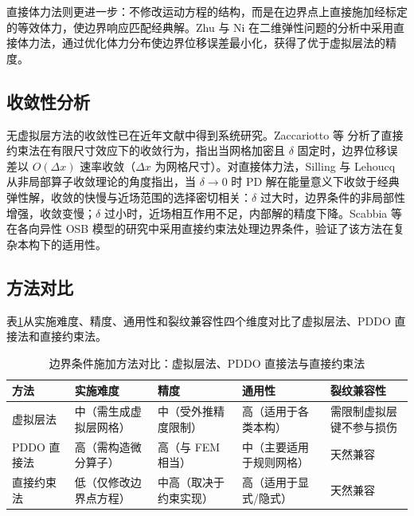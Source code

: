 直接体力法则更进一步：不修改运动方程的结构，而是在边界点上直接施加经标定的等效体力，使边界响应匹配经典解。Zhu 与 Ni \cite{ZhuNi2017} 在二维弹性问题的分析中采用直接体力法，通过优化体力分布使边界位移误差最小化，获得了优于虚拟层法的精度。

\subsection{收敛性分析}

无虚拟层方法的收敛性已在近年文献中得到系统研究。Zaccariotto 等 \cite{Zaccariotto2018} 分析了直接约束法在有限尺寸效应下的收敛行为，指出当网格加密且 $\delta$ 固定时，边界位移误差以 $O(\Delta x)$ 速率收敛（$\Delta x$ 为网格尺寸）。对直接体力法，Silling 与 Lehoucq \cite{SillingLehoucq2008} 从非局部算子收敛理论的角度指出，当 $\delta\to 0$ 时 PD 解在能量意义下收敛于经典弹性解，收敛的快慢与近场范围的选择密切相关：$\delta$ 过大时，边界条件的非局部性增强，收敛变慢；$\delta$ 过小时，近场相互作用不足，内部解的精度下降。Scabbia 等 \cite{Scabbia2024} 在各向异性 OSB 模型的研究中采用直接约束法处理边界条件，验证了该方法在复杂本构下的适用性。

\subsection{方法对比}

表\ref{tab:bc-methods-compare}从实施难度、精度、通用性和裂纹兼容性四个维度对比了虚拟层法、PDDO 直接法和直接约束法。

\begin{table}[htbp]
\centering
\small
\caption{边界条件施加方法对比：虚拟层法、PDDO 直接法与直接约束法}
\label{tab:bc-methods-compare}
\begin{tabular}{>{\raggedright\arraybackslash}p{}>{\raggedright\arraybackslash}p{}>{\raggedright\arraybackslash}p{}>{\raggedright\arraybackslash}p{}>{\raggedright\arraybackslash}p{}}
\toprule
方法 & 实施难度 & 精度 & 通用性 & 裂纹兼容性 \\
\midrule
虚拟层法 & 中（需生成虚拟层网格） & 中（受外推精度限制） & 高（适用于各类本构） & 需限制虚拟层键不参与损伤 \\
PDDO 直接法 & 高（需构造微分算子） & 高（与 FEM 相当） & 中（主要适用于规则网格） & 天然兼容 \\
直接约束法 & 低（仅修改边界点方程） & 中高（取决于约束实现） & 高（适用于显式/隐式） & 天然兼容 \\
\bottomrule
\end{tabular}
\end{table}

